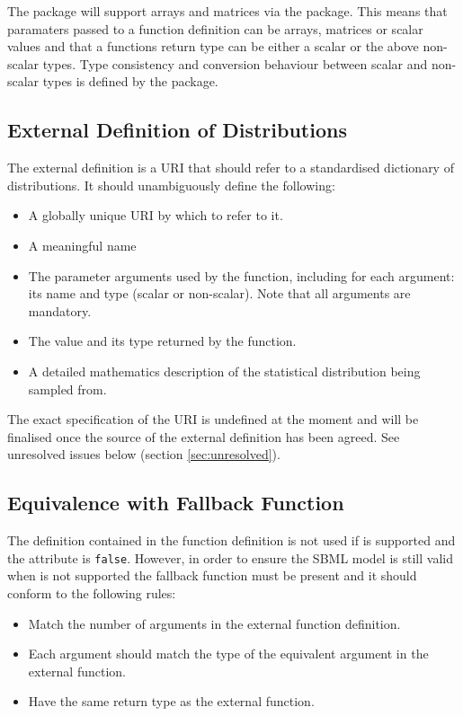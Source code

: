 \documentclass[draftspec]{sbmlpkgspec}
\begin{document}
The \distrib package will support arrays and matrices via the \arrays
package. This means that paramaters passed to a function definition
can be arrays, matrices or scalar values and that a functions return
type can be either a scalar or the above non-scalar types. Type
consistency and conversion behaviour between scalar and non-scalar
types is defined by the \arrays package.

\subsection{External Definition of Distributions}
\label{sec:extlDefnDistn}
\label{sec:externaldistdef}

The external definition is a URI that should refer to a standardised
dictionary of distributions. It should unambiguously define the
following:

\begin{itemize}
\item A globally unique URI by which to refer to it.
\item A meaningful name
\item The parameter arguments used by the function, including for each
 argument: its name and type (scalar or non-scalar). Note that all
 arguments are mandatory.
\item The value and its type returned by the function.
\item A detailed mathematics description of the statistical distribution being
  sampled from.
\end{itemize}

The exact specification of the URI is undefined at the moment and will
be finalised once the source of the external definition has been
agreed. See unresolved issues below (section
\ref{sec:unresolved}).


\subsection{Equivalence with Fallback Function}

The \mathml definition contained in the function definition is not
used if \distribshort is supported and the  attribute
is \texttt{false}. However, in order to ensure the SBML model is still
valid when \distribshort is not supported the fallback function must
be present and it should conform to the following rules:

\begin{itemize}
\item Match the number of arguments in the external function
  definition.
\item Each argument should match the type of the equivalent argument
  in the external function.
\item Have the same return type as the external function.
\end{itemize}
\end{document}
